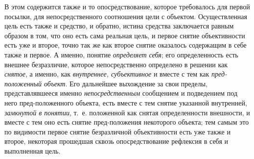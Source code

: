 \documentclass[twoside]{article}
\begin{document}
{{{{В этом содержится также и то опосредствование, которое
требовалось для первой посылки, для непосредственного соотношения цели с
объектом. Осуществленная цель есть также и средство, и обратно, истина
средства заключается равным образом в том, что оно есть сама реальная цель,
и первое снятие объективности есть уже и второе, точно так же как второе
снятие оказалось содержащим в себе также и первое. А именно, понятие
{\em определяет себя};
его определенность есть внешнее безразличие, которое
непосредственно определено в решении как
{\em снятое}, а именно,
как {\em внутреннее, субъективное}
и вместе с тем как
{\em пред-положенный
объект}. Его дальнейшее выхождение за свои пределы,
представлявшееся именно
{\em непосредственным}
сообщением и подведением под него пред-положенного объекта,
есть вместе с тем снятие указанной внутренней,
{\em замкнутой в понятии},
т.~е. положенной как снятая определенности внешности, и
вместе с тем оно есть снятие пред-положения некоторого объекта; тем самым
это по видимости первое снятие безразличной объективности
есть уже также и второе, некоторая прошедшая сквозь опосредствование
рефлексия в себя и выполненная цель.

}}}}
\end{document}
